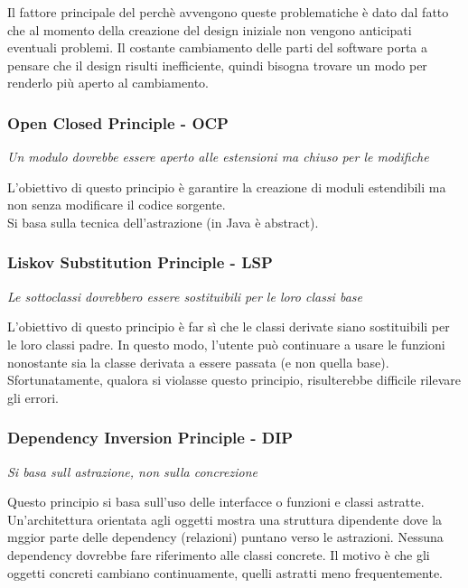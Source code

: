 {\begin{center}
{\begin{tabular}{|
                    >{\columncolor[HTML]{3531FF}}l |l|}
            \end{tabular}%
        }
    \end{center}
    Il fattore principale del perchè avvengono queste problematiche è dato dal fatto che al
    momento della creazione del design iniziale non vengono anticipati eventuali problemi.
    Il costante cambiamento delle parti del software porta a pensare che il design risulti
    inefficiente, quindi bisogna trovare un modo per renderlo più aperto al cambiamento.

    \subsubsection{Open Closed Principle - OCP}
    \textit{Un modulo dovrebbe essere aperto alle estensioni ma chiuso per le modifiche}
    
    L'obiettivo di questo principio è garantire la creazione di moduli estendibili ma non senza modificare il codice sorgente.\\
    Si basa sulla tecnica dell'astrazione (in Java è abstract).
    
    \subsubsection{Liskov Substitution Principle - LSP}
    \textit{Le sottoclassi dovrebbero essere sostituibili per le loro classi base}
    
    L'obiettivo di questo principio è far sì che le classi derivate siano sostituibili per le loro classi padre. In questo modo,
    l'utente può continuare a usare le funzioni nonostante sia la classe derivata a essere passata (e non quella base).\\
    Sfortunatamente, qualora si violasse questo principio, risulterebbe difficile rilevare gli errori.
    
    \newpage
    \subsubsection{Dependency Inversion Principle - DIP}
    \textit{Si basa sull astrazione, non sulla concrezione}
    
    Questo principio si basa sull'uso delle interfacce o funzioni e classi astratte. Un'architettura orientata
    agli oggetti mostra una struttura dipendente dove la mggior parte delle dependency (relazioni) puntano verso
    le astrazioni. Nessuna dependency dovrebbe fare riferimento alle classi concrete. Il motivo è che gli oggetti concreti
    cambiano continuamente, quelli astratti meno frequentemente.
    
}
